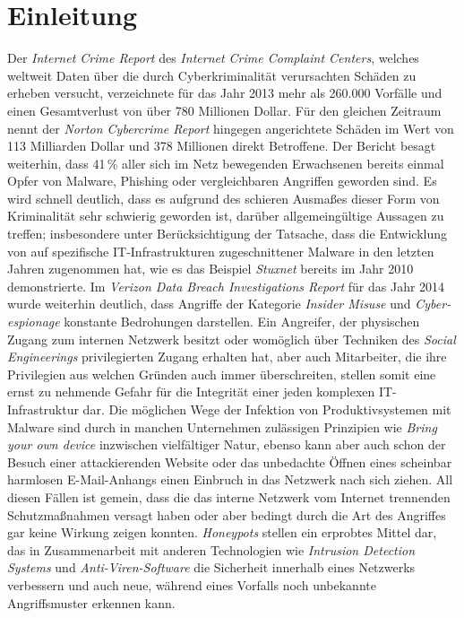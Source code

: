 \documentclass[12pt]{article}
\begin{document}
\tableofcontents

\newpage
{}

\part{Einleitung}
Der \textit{Internet Crime Report} des \textit{Internet Crime Complaint Centers}, welches weltweit Daten über die durch Cyberkriminalität verursachten Schäden zu erheben versucht, verzeichnete für das Jahr 2013 mehr als 260.000 Vorfälle und einen Gesamtverlust von über 780 Millionen Dollar. Für den gleichen Zeitraum nennt der \textit{Norton Cybercrime Report} hingegen angerichtete Schäden im Wert von 113 Milliarden Dollar und 378 Millionen direkt Betroffene. Der Bericht besagt weiterhin, dass 41\,\% aller sich im Netz bewegenden Erwachsenen bereits einmal Opfer von Malware, Phishing oder vergleichbaren Angriffen geworden sind. Es wird schnell deutlich, dass es aufgrund des schieren Ausmaßes dieser Form von Kriminalität sehr schwierig geworden ist, darüber allgemeingültige Aussagen zu treffen; insbesondere unter Berücksichtigung der Tatsache, dass die Entwicklung von auf spezifische IT-Infrastrukturen zugeschnittener Malware in den letzten Jahren zugenommen hat, wie es das Beispiel \textit{Stuxnet} bereits im Jahr 2010 demonstrierte. Im \textit{Verizon Data Breach Investigations Report} für das Jahr 2014 wurde weiterhin deutlich, dass Angriffe der Kategorie \textit{Insider Misuse} und \textit{Cyber-espionage} konstante Bedrohungen darstellen. Ein Angreifer, der physischen Zugang zum internen Netzwerk besitzt oder womöglich über Techniken des \textit{Social Engineerings} privilegierten Zugang erhalten hat, aber auch Mitarbeiter, die ihre Privilegien aus welchen Gründen auch immer überschreiten, stellen somit eine ernst zu nehmende Gefahr für die Integrität einer jeden komplexen IT-Infrastruktur dar. Die möglichen Wege der Infektion von Produktivsystemen mit Malware sind durch in manchen Unternehmen zulässigen Prinzipien wie \textit{Bring your own device} inzwischen vielfältiger Natur, ebenso kann aber auch schon der Besuch einer attackierenden Website oder das unbedachte Öffnen eines scheinbar harmlosen E-Mail-Anhangs einen Einbruch in das Netzwerk nach sich ziehen. All diesen Fällen ist gemein, dass die das interne Netzwerk vom Internet trennenden Schutzmaßnahmen versagt haben oder aber bedingt durch die Art des Angriffes gar keine Wirkung zeigen konnten. \textit{Honeypots} stellen ein erprobtes Mittel dar, das in Zusammenarbeit mit anderen Technologien wie \textit{Intrusion Detection Systems} und \textit{Anti-Viren-Software} die Sicherheit innerhalb eines Netzwerks verbessern und auch neue, während eines Vorfalls noch unbekannte Angriffsmuster erkennen kann.
\end{document}
